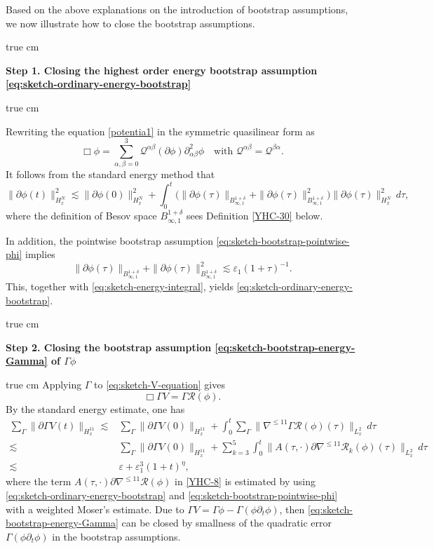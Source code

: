 \documentclass[11pt,twoside]{article}
\def\p{\partial}
\def\ls{\lesssim}
\theoremstyle{plain}
\theoremstyle{definition}
\theoremstyle{assumption}
\numberwithin{equation}{section}
\begin{document}
Based on the above explanations on the introduction of bootstrap assumptions, we now illustrate how to
close the bootstrap assumptions.

 true cm

{\bf Step 1. Closing the highest order energy bootstrap assumption \eqref{eq:sketch-ordinary-energy-bootstrap}}

 true cm

Rewriting the equation \eqref{potentia1} in the symmetric quasilinear form as
	$$\Box\phi=\sum_{\alpha,\beta=0}^3
	\mathcal Q^{\alpha\beta}(\partial\phi)
	\partial_{\alpha\beta}^2\phi
	\quad\text{with $\mathcal Q^{\alpha\beta}
	=\mathcal Q^{\beta\alpha}$}.$$
	It follows from the standard energy method that
	\begin{equation}
		\label{eq:sketch-energy-integral}
		\|\partial\phi(t)\|_{H^N_x}^2
		\lesssim
		\|\partial\phi(0)\|_{H^N_x}^2
		+
		\int_0^t
		\big(
		\|\partial\phi(\tau)\|_{B^{1+\delta}_{\infty,1}}
		+
		\|\partial\phi(\tau)\|_{B^{1+\delta}_{\infty,1}}^2
		\big)
		\|\partial\phi(\tau)\|_{H^N_x}^2\,d\tau,
	\end{equation}
where the definition of Besov space $B^{1+\delta}_{\infty,1}$ sees Definition \ref {YHC-30} below.

	In addition, the pointwise bootstrap assumption \eqref{eq:sketch-bootstrap-pointwise-phi} implies
	\[
	\|\partial\phi(\tau)\|_{B^{1+\delta}_{\infty,1}}
	+
	\|\partial\phi(\tau)\|_{B^{1+\delta}_{\infty,1}}^2
	\lesssim
	\varepsilon_1(1+\tau)^{-1}.
	\]
This, together with \eqref{eq:sketch-energy-integral}, yields \eqref{eq:sketch-ordinary-energy-bootstrap}.

 true cm
	
{\bf Step 2. Closing the bootstrap assumption \eqref{eq:sketch-bootstrap-energy-Gamma} of $\Gamma\phi$}


 true cm
	Applying \(\Gamma\) to \eqref{eq:sketch-V-equation} gives
	\[
	\Box\Gamma V=\Gamma\mathcal R(\phi).
	\]
	By the standard energy estimate, one has
	\begin{equation}\label{YHC-8}
		\begin{aligned}
			\sum_{\Gamma}
			\|\p\Gamma V(t)\|_{H^{11}_x}
			\ls
			&
			\sum_{\Gamma}
			\|\p\Gamma V(0)\|_{H^{11}_x}
			+
			\int_0^t
			\sum_{\Gamma}
			\|\nabla^{\le 11}\Gamma\mathcal R(\phi)(\tau)\|_{L^2_x}
			\,d\tau
			\\
			\ls
			&
			\sum_{\Gamma}
			\|\p\Gamma V(0)\|_{H^{11}_x}
			+
			\sum_{k=3}^{5}\int_0^t
			\|A(\tau,\cdot)\p\nabla^{\le 11}\mathcal R_k(\phi)(\tau)\|_{L^2_x}
			\,d\tau
			\\
			\lesssim&
			\varepsilon+\varepsilon_1^3(1+t)^\eta,
		\end{aligned}
	\end{equation}
	where the term \(A(\tau,\cdot)\p\nabla^{\le 11}\mathcal R(\phi)\) in \eqref{YHC-8} is estimated by
	using \eqref{eq:sketch-ordinary-energy-bootstrap} and \eqref{eq:sketch-bootstrap-pointwise-phi}
	with a weighted Moser's estimate.
	Due to $\Gamma V=\Gamma\phi-\Gamma(\phi\partial_t\phi)$,
then \eqref{eq:sketch-bootstrap-energy-Gamma} can be closed by smallness
of the quadratic error $\Gamma(\phi\partial_t\phi)$ in the bootstrap assumptions.
	
\end{document}

